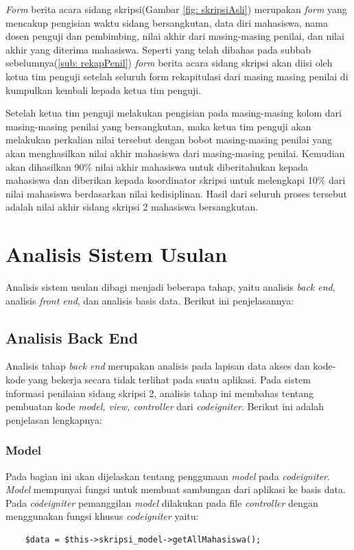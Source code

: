 	\textit{Form} berita acara sidang skripsi(Gambar \ref{fig: skripsiAsli}) merupakan \textit{form} yang mencakup pengisian waktu sidang bersangkutan, data diri mahasiswa, nama dosen penguji dan pembimbing, nilai akhir dari masing-masing penilai, dan nilai akhir yang diterima mahasiswa. Seperti yang telah dibahas pada subbab sebelumnya(\ref{sub: rekapPenil}) \textit{form} berita acara sidang skripsi akan diisi oleh ketua tim penguji setelah seluruh form rekapitulasi dari masing masing penilai di kumpulkan kembali kepada ketua tim penguji.
	
	Setelah ketua tim penguji melakukan pengisian pada masing-masing kolom dari masing-masing penilai yang bersangkutan, maka ketua tim penguji akan melakukan perkalian nilai tersebut dengan bobot masing-masing penilai yang akan menghasilkan nilai akhir mahasiswa dari masing-masing penilai. Kemudian akan dihasilkan 90\% nilai akhir mahasiswa untuk diberitahukan kepada mahasiswa dan diberikan kepada koordinator skripsi untuk melengkapi 10\% dari nilai mahasiswa berdasarkan nilai kedisiplinan. Hasil dari seluruh proses tersebut adalah nilai akhir sidang skripsi 2 mahasiswa bersangkutan.
	
\section{Analisis Sistem Usulan}
\label{sec: analisisSUsulan}

Analisis sistem usulan dibagi menjadi beberapa tahap, yaitu analisis \textit{back end}, analisis \textit{front end}, dan analisis basis data. Berikut ini penjelasannya:
	
	\subsection{Analisis Back End}
	\label{sub: backEnd}
	
	Analisis tahap \textit{back end} merupakan analisis pada lapisan data akses dan kode-kode yang bekerja secara tidak terlihat pada suatu aplikasi. Pada sistem informasi penilaian sidang skripsi 2, analisis tahap ini membahas tentang pembuatan kode \textit{model, view, controller} dari \textit{codeigniter}. Berikut ini adalah penjelasan lengkapnya:
	
	\subsubsection{Model}
	\label{subsub: modelCI}
	
	Pada bagian ini akan dijelaskan tentang penggunaan \textit{model} pada \textit{codeigniter}. \textit{Model} mempunyai fungsi untuk membuat sambungan dari aplikasi ke basis data. Pada \textit{codeigniter} pemanggilan \textit{model} dilakukan pada file \textit{controller} dengan menggunakan fungsi khusus \textit{codeigniter} yaitu:
	\begin{lstlisting}
	$data = $this->skripsi_model->getAllMahasiswa();
	\end{lstlisting}
	

